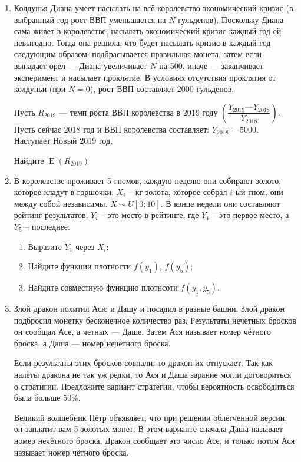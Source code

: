 \documentclass[a4paper,12pt]{article}
\DeclareMathOperator{\E}{E}
\begin{document}
\begin{enumerate}
\item

 Колдунья Диана умеет насылать на всё королевство экономический кризис (в выбранный год рост ВВП уменьшается на $N$ гульденов). Поскольку Диана сама живет в королевстве, насылать экономический кризис каждый год ей невыгодно. Тогда она решила, что будет насылать кризис в каждый год следующим образом: подбрасывается правильная монета, затем если выпадает орел — Диана увеличивает $N$ на 500, иначе — заканчивает эксперимент и насылает проклятие. В условиях отсутствия проклятия от колдуньи (при $N = 0$), рост ВВП составляет 2000 гульденов.

Пусть $R_{2019}$ — темп роста ВВП королевства в 2019 году $\left( \dfrac{Y_{2019} — Y_{2018}}{Y_{2018}} \right).$ Пусть сейчас 2018 год и ВВП королевства составляет: $Y_{2018} = 5000$. Наступает Новый 2019 год.

Найдите $\E(R_{2019})$
\item
В королевстве проживает 5 гномов, каждую неделю они собирают золото, которое кладут в горшочки, $X_i$ – кг золота, которое собрал $i$-ый гном, они между собой независимы. $X\sim U[0;10]$. В конце недели они составляют рейтинг результатов, $Y_i$ – это место в рейтинге, где $Y_1$ – это первое место, а $Y_5$ – последнее.
\begin{enumerate}
\item Выразите $Y_1$ через $X_i$;
\item Найдите функции плотности $f(y_1)$, $f(y_5)$;
\item Найдите совместную функцию плотнсоти $f(y_1, y_5)$.
\end{enumerate}

\item

 Злой дракон похитил Асю и Дашу и посадил в разные башни. Злой дракон подбросил монетку бесконечное количество раз. Результаты нечетных бросков он сообщал Асе, а четных — Даше.  Затем Ася называет номер чётного броска, а Даша — номер нечётного броска.

 Если результаты этих бросков совпали, то дракон их отпускает. Так как налёты дракона не так уж редки, то Ася и Даша зарание могли договориться о стратигии.  Предложите вариант стратегии, чтобы вероятность освободиться была больше 50\%.

 Великий волшебник Пётр объявляет, что при решении облегченной версии, он заплатит вам 5 золотых монет. В этом варианте сначала Даша называет номер нечётного броска, Дракон сообщает это число Асе, и только потом Ася называет номер чётного броска.
\end{enumerate}
\end{document}
